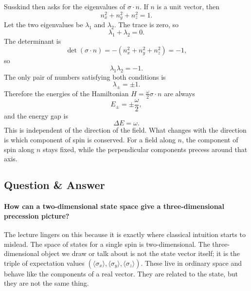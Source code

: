 Susskind then asks for the eigenvalues of \(\sigma\cdot n\). If \(n\) is a unit vector, then
\begin{equation}
n_x^2+n_y^2+n_z^2=1.
\end{equation}
Let the two eigenvalues be \(\lambda_1\) and \(\lambda_2\). The trace is zero, so
\begin{equation}
\lambda_1+\lambda_2=0.
\end{equation}
The determinant is
\begin{equation}
\det(\sigma\cdot n)=-(n_x^2+n_y^2+n_z^2)=-1,
\end{equation}
so
\begin{equation}
\lambda_1\lambda_2=-1.
\end{equation}
The only pair of numbers satisfying both conditions is
\begin{equation}
\lambda_\pm=\pm 1.
\end{equation}
Therefore the energies of the Hamiltonian \(H=\frac{\omega}{2}\sigma\cdot n\) are always
\begin{equation}
E_\pm=\pm \frac{\omega}{2},
\end{equation}
and the energy gap is
\begin{equation}
\Delta E=\omega.
\end{equation}
This is independent of the direction of the field. What changes with the direction is which component of spin is conserved. For a field along \(n\), the component of spin along \(n\) stays fixed, while the perpendicular components precess around that axis.

\subsection{Question \& Answer}

\paragraph{How can a two-dimensional state space give a three-dimensional precession picture?}
The lecture lingers on this because it is exactly where classical intuition starts to mislead. The space of states for a single spin is two-dimensional. The three-dimensional object we draw or talk about is not the state vector itself; it is the triple of expectation values \((\langle \sigma_x\rangle,\langle \sigma_y\rangle,\langle \sigma_z\rangle)\). These live in ordinary space and behave like the components of a real vector. They are related to the state, but they are not the same thing.

